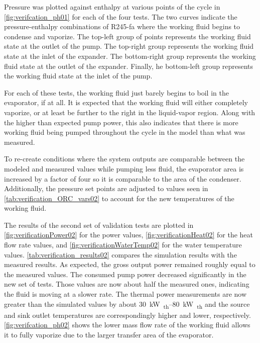 
Pressure was plotted against enthalpy at various points of the cycle in \autoref{fig:verifcation_ph01}  for each of the four tests. The two curves indicate the pressure-enthalpy combinations of R245-fa where the working fluid begins to condense and vaporize. The top-left group of points represents the working fluid state at the outlet of the pump. The top-right group represents the working fluid state at the inlet of the expander. The bottom-right group represents the working fluid state at the outlet of the expander. Finally, he bottom-left group represents the working fluid state at the inlet of the pump.
%

For each of these tests, the working fluid just barely begins to boil in the evaporator, if at all. It is expected that the working fluid will either completely vaporize, or at least be further to the right in the liquid-vapor region. Along with the higher than expected pump power, this also indicates that there is more working fluid being pumped throughout the cycle in the model than what was measured.

To re-create conditions where the system outputs are comparable between the modeled and measured values while pumping less fluid, the evaporator area is increased by a factor of four so it is comparable to the area of the condenser. Additionally, the pressure set points are adjusted to values seen in \autoref{tab:verification_ORC_vars02} to account for the new temperatures of the working fluid.


The results of the second set of validation tests are plotted in \autoref{fig:verificationPower02} 
for the power values, \autoref{fig:verificationHeat02}  
for the heat flow rate values, and \autoref{fig:verificationWaterTemp02} 
for the water temperature values. \autoref{tab:verification_results02}  compares the simulation results with the measured results. As expected, the gross output power remained roughly equal to the measured values. The consumed pump power decreased significantly in the new set of tests. Those values are now about half the measured ones, indicating the fluid is moving at a slower rate. The thermal power measurements are now greater than the simulated values by about \SIrange{30}{80}{\kilo\watt\textsubscript{th}} and the source and sink outlet temperatures are correspondingly higher and lower, respectively. \autoref{fig:verifcation_ph02} 
shows the lower mass flow rate of the working fluid allows it to fully vaporize due to the larger transfer area of the evaporator. 

